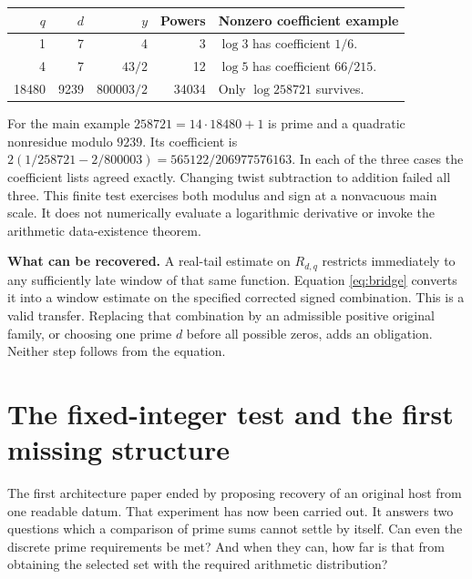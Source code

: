 \documentclass[12pt,letterpaper]{article}
\begin{document}
\begin{center}\small\begin{tabularx}{\linewidth}{@{}rrr r Y@{}}\toprule
$q$ & $d$ & $y$ & Powers & Nonzero coefficient example\\ & 7 & 4 & 3 & $\log3$ has coefficient $1/6$.\\
4 & 7 & $43/2$ & 12 & $\log5$ has coefficient $66/215$.\\
18480 & 9239 & $800003/2$ & 34034 & Only $\log258721$ survives.\\\bottomrule
\end{tabularx}\end{center}
For the main example $258721=14\cdot18480+1$ is prime and a quadratic nonresidue modulo $9239$. Its coefficient is $2(1/258721-2/800003)=565122/206977576163$. In each of the three cases the coefficient lists agreed exactly. Changing twist subtraction to addition failed all three. This finite test exercises both modulus and sign at a nonvacuous main scale. It does not numerically evaluate a logarithmic derivative or invoke the arithmetic data-existence theorem.


\textbf{What can be recovered.} A real-tail estimate on $R_{d,q}$ restricts immediately to any sufficiently late window of that same function. Equation \eqref{eq:bridge} converts it into a window estimate on the specified corrected signed combination. This is a valid transfer. Replacing that combination by an admissible positive original family, or choosing one prime $d$ before all possible zeros, adds an obligation. Neither step follows from the equation.



\section{The fixed-integer test and the first missing structure}
The first architecture paper ended by proposing recovery of an original host from one readable datum. That experiment has now been carried out. It answers two questions which a comparison of prime sums cannot settle by itself. Can even the discrete prime requirements be met? And when they can, how far is that from obtaining the selected set with the required arithmetic distribution?
\end{document}
